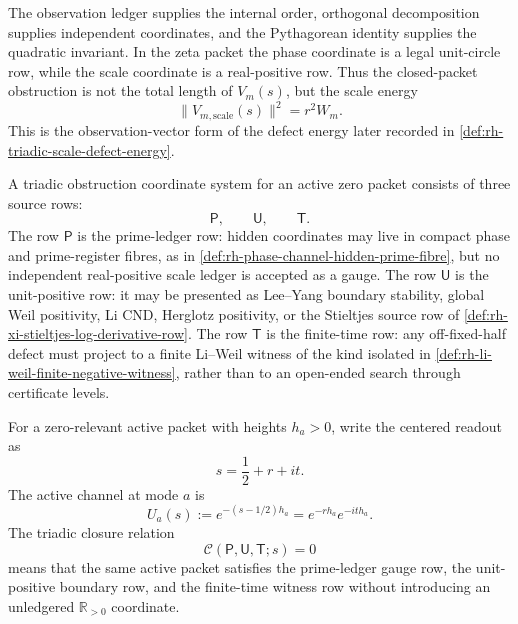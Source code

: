 \begin{principle}
\label{prin:rh-observation-orthogonality-invariant}
The observation ledger supplies the internal order, orthogonal
decomposition supplies independent coordinates, and the Pythagorean
identity supplies the quadratic invariant.  In the zeta packet the phase
coordinate is a legal unit-circle row, while the scale coordinate is a
real-positive row.  Thus the closed-packet obstruction is not the total
length of $V_m(s)$, but the scale energy
$$
\|V_{m,\mathrm{scale}}(s)\|^2=r^2W_m.
$$
This is the observation-vector form of the defect energy later recorded
in \autoref{def:rh-triadic-scale-defect-energy}.
\end{principle}

\begin{definition}
\label{def:rh-triadic-obstruction-coordinates}
A triadic obstruction coordinate system for an active zero packet
consists of three source rows:
$$
\mathsf P,\qquad \mathsf U,\qquad \mathsf T.
$$
The row $\mathsf P$ is the prime-ledger row: hidden coordinates may live
in compact phase and prime-register fibres, as in
\autoref{def:rh-phase-channel-hidden-prime-fibre}, but no independent
real-positive scale ledger is accepted as a gauge.  The row $\mathsf U$
is the unit-positive row: it may be presented as Lee--Yang boundary
stability, global Weil positivity, Li CND, Herglotz positivity, or the
Stieltjes source row of
\autoref{def:rh-xi-stieltjes-log-derivative-row}.  The row $\mathsf T$
is the finite-time row: any off-fixed-half defect must project to a
finite Li--Weil witness of the kind isolated in
\autoref{def:rh-li-weil-finite-negative-witness}, rather than to an
open-ended search through certificate levels.
\end{definition}

\begin{definition}
\label{def:rh-triadic-closure-relation}
For a zero-relevant active packet with heights $h_a>0$, write the
centered readout as
$$
s=\frac12+r+it.
$$
The active channel at mode $a$ is
$$
U_a(s):=e^{-(s-1/2)h_a}
=
e^{-r h_a}e^{-it h_a}.
$$
The triadic closure relation
$$
\mathcal C(\mathsf P,\mathsf U,\mathsf T;s)=0
$$
means that the same active packet satisfies the prime-ledger gauge row,
the unit-positive boundary row, and the finite-time witness row without
introducing an unledgered $\mathbb R_{>0}$ coordinate.
\end{definition}

